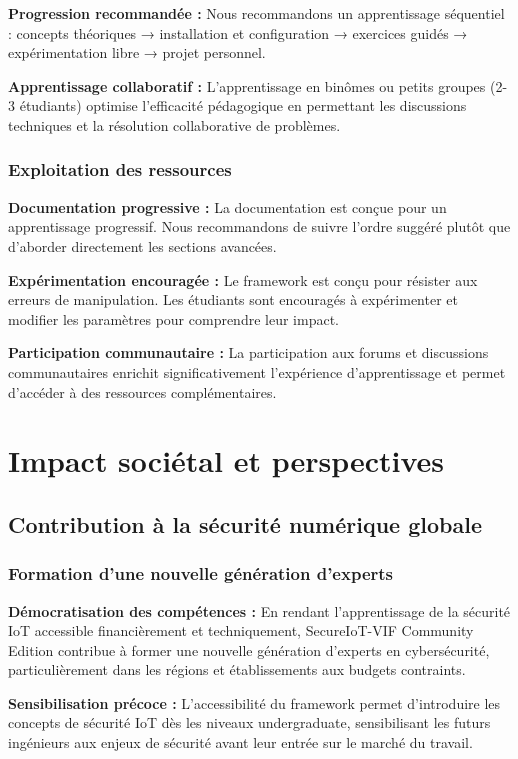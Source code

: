 \textbf{Progression recommandée :} Nous recommandons un apprentissage séquentiel : concepts théoriques → installation et configuration → exercices guidés → expérimentation libre → projet personnel.

\textbf{Apprentissage collaboratif :} L'apprentissage en binômes ou petits groupes (2-3 étudiants) optimise l'efficacité pédagogique en permettant les discussions techniques et la résolution collaborative de problèmes.

\subsubsection{Exploitation des ressources}

\textbf{Documentation progressive :} La documentation est conçue pour un apprentissage progressif. Nous recommandons de suivre l'ordre suggéré plutôt que d'aborder directement les sections avancées.

\textbf{Expérimentation encouragée :} Le framework est conçu pour résister aux erreurs de manipulation. Les étudiants sont encouragés à expérimenter et modifier les paramètres pour comprendre leur impact.

\textbf{Participation communautaire :} La participation aux forums et discussions communautaires enrichit significativement l'expérience d'apprentissage et permet d'accéder à des ressources complémentaires.

\section{Impact sociétal et perspectives}

\subsection{Contribution à la sécurité numérique globale}

\subsubsection{Formation d'une nouvelle génération d'experts}

\textbf{Démocratisation des compétences :} En rendant l'apprentissage de la sécurité IoT accessible financièrement et techniquement, SecureIoT-VIF Community Edition contribue à former une nouvelle génération d'experts en cybersécurité, particulièrement dans les régions et établissements aux budgets contraints.

\textbf{Sensibilisation précoce :} L'accessibilité du framework permet d'introduire les concepts de sécurité IoT dès les niveaux undergraduate, sensibilisant les futurs ingénieurs aux enjeux de sécurité avant leur entrée sur le marché du travail.

